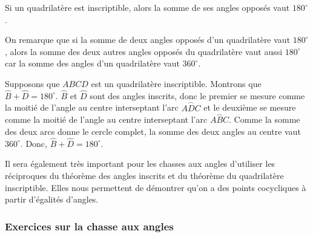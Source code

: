 \begin{thm}
Si un quadrilatère est inscriptible, alors la somme de ses angles opposés vaut $180^\circ$.
\end{thm}
\begin{figure}[H]
\end{figure}

On remarque que si la somme de deux angles opposés d'un quadrilatère vaut $180^\circ$, alors la somme des deux autres angles opposés du quadrilatère vaut aussi $180^\circ$ car la somme des angles d'un quadrilatère vaut $360^\circ$.

\begin{preuve}
Supposons que $ABCD$ est un quadrilatère inscriptible. Montrons que $\widehat{B}+\widehat{D}=180^\circ$.
$\widehat{B}$ et $\widehat{D}$ sont des angles inscrits, donc le premier se mesure comme la moitié de l'angle au centre interseptant l'arc $\stackrel \frown{ADC}$ et le deuxième se mesure comme la moitié de l'angle au centre interseptant l'arc $\stackrel \frown{ABC}$. Comme la somme des deux arcs donne le cercle complet, la somme des deux angles au centre vaut $360^\circ$. Donc, $\widehat{B}+\widehat{D}=180^\circ$.
\end{preuve}

Il sera également très important pour les chasses aux angles d'utiliser les réciproques du théorème des angles inscrits et du théorème du quadrilatère inscriptible. Elles nous permettent de démontrer qu'on a des points cocycliques à partir d'égalités d'angles.


\subsubsection{Exercices sur la chasse aux angles}


